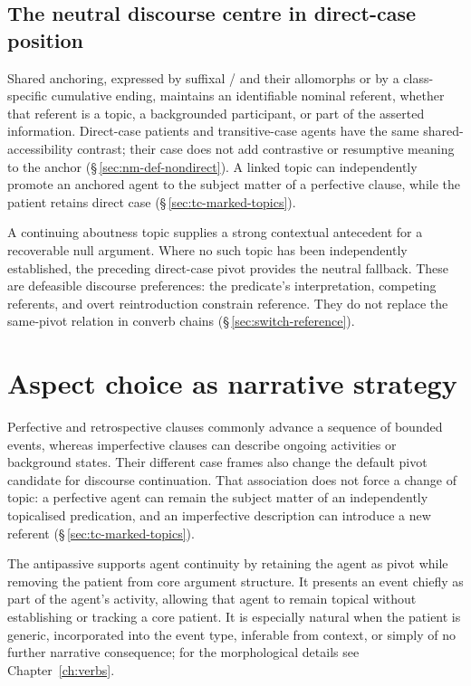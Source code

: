 \subsection{The neutral discourse centre in direct-case position}
\label{sec:disc-def}

Shared anchoring, expressed by suffixal / and their
 allomorphs or by a class-specific cumulative ending, maintains an identifiable
 nominal referent, whether that referent is a topic, a backgrounded participant, or
 part of the asserted information. Direct-case patients and transitive-case
 agents have the same shared-accessibility contrast; their case does not add
 contrastive or resumptive meaning to the anchor
 (§\,\ref{sec:nm-def-nondirect}). A linked topic can independently promote
 an anchored agent to the subject matter of a perfective clause, while the
 patient retains direct case (§\,\ref{sec:tc-marked-topics}).

A continuing aboutness topic supplies a strong contextual antecedent for a
 recoverable null argument. Where no such topic has been independently
 established, the preceding direct-case pivot provides the neutral fallback.
 These are defeasible discourse preferences: the predicate's interpretation,
 competing referents, and overt reintroduction constrain reference. They do
 not replace the same-pivot relation in converb chains
 (§\,\ref{sec:switch-reference}).

\section{Aspect choice as narrative strategy}\label{sec:aspect-narrative}

Perfective and retrospective clauses commonly advance a sequence of bounded
 events, whereas imperfective clauses can describe ongoing activities or
 background states. Their different case frames also change the default
 pivot candidate for discourse continuation. That association does not force
 a change of topic: a perfective agent can remain the subject matter of an
 independently topicalised predication, and an imperfective description can
 introduce a new referent (§\,\ref{sec:tc-marked-topics}).

The antipassive supports agent continuity by retaining the agent as pivot
while removing the patient from core argument structure. It presents an
event chiefly as part of the agent's activity, allowing that agent to remain
topical without establishing or tracking a core patient. It is especially natural when
the patient is generic, incorporated into the event type, inferable from
context, or simply of no further narrative consequence; for the morphological
details see Chapter~\ref{ch:verbs}.

